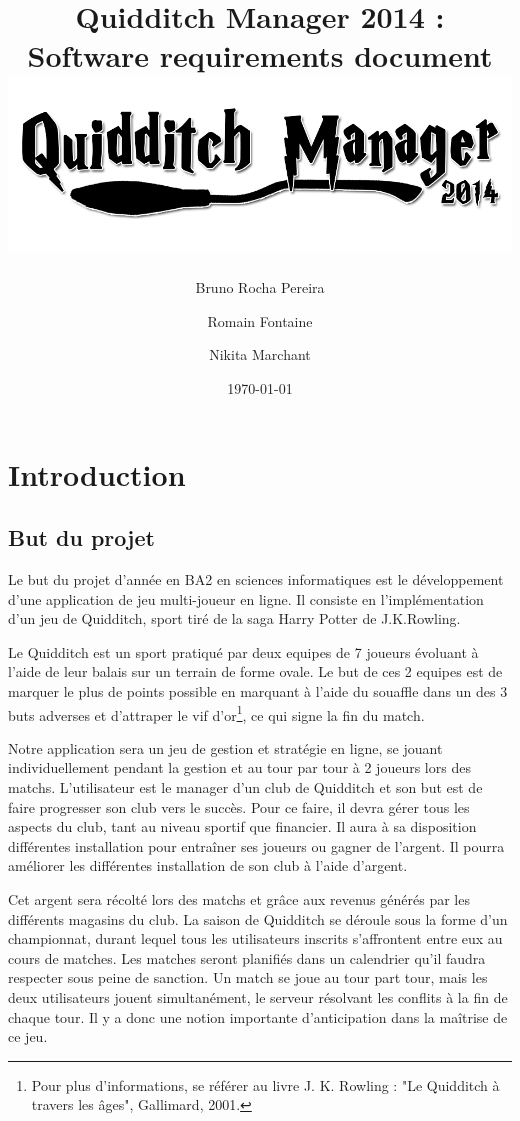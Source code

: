 \documentclass[a4paper]{report}
\title{Quidditch Manager 2014 : \\Software requirements document\\ \includegraphics[width=\textwidth]{logo.png}}
\author{Bruno Rocha Pereira \and Romain Fontaine \and Nikita Marchant}
\date{\today}
\begin{document}
\maketitle
\tableofcontents
\clearpage


\chapter{Introduction}
\section{But du projet}
Le but du projet d'année en BA2 en sciences informatiques est le développement d'une application de jeu multi-joueur en ligne.
Il consiste en l'implémentation d'un jeu de Quidditch, sport tiré de la saga Harry Potter de J.K.Rowling.


Le Quidditch est un sport pratiqué par deux \glspl{equipe} de 7 \glspl{joueur} évoluant à l'aide de leur balais sur un terrain de forme ovale. Le but de ces 2 \glspl{equipe} est de marquer le plus de points possible en marquant à l'aide du souaffle dans un des 3 buts adverses et d'attraper le vif d'or\footnote{Pour plus d'informations, se référer au livre J. K. Rowling : "Le Quidditch à travers les âges", Gallimard, 2001.}, ce qui signe la fin du match. 


Notre application sera un jeu de gestion et stratégie en ligne, se jouant individuellement pendant la gestion et au tour par tour à 2 joueurs lors des matchs. L'\gls{utilisateur} est le \gls{manager} d'un \gls{club} de Quidditch et son but est de faire progresser son \gls{club} vers le succès. Pour ce faire, il devra gérer tous les aspects du \gls{club}, tant au niveau sportif que financier. Il aura à sa disposition différentes installation pour entraîner ses \glspl{joueur} ou gagner de l'argent. Il pourra améliorer les différentes installation de son \gls{club} à l'aide d'argent.

Cet argent sera récolté lors des matchs et grâce aux revenus générés par les différents magasins du \gls{club}. La saison de Quidditch se déroule sous la forme d'un championnat, durant lequel tous les \glspl{utilisateur} inscrits s'affrontent entre eux au cours de matches. Les matches seront planifiés dans un calendrier qu'il faudra respecter sous peine de sanction. Un match se joue au tour part tour, mais les deux \glspl{utilisateur} jouent simultanément, le \gls{serveur} résolvant les conflits à la fin de chaque tour. Il y a donc une notion importante d'anticipation dans la maîtrise de ce jeu.
\end{document}
